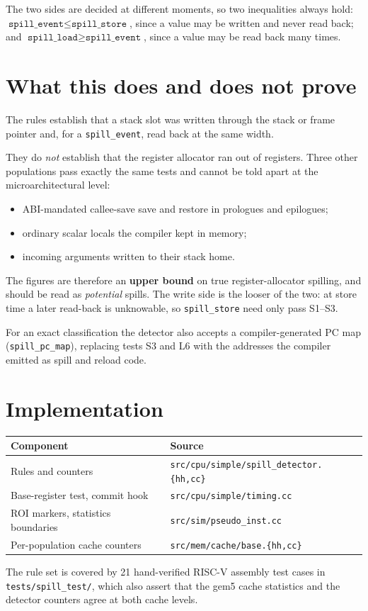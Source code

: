 \documentclass[10pt,a4paper]{article}
\begin{document}
The two sides are decided at different moments, so two inequalities always
hold: $\texttt{spill\_event} \le \texttt{spill\_store}$, since a value may be
written and never read back; and
$\texttt{spill\_load} \ge \texttt{spill\_event}$, since a value may be read
back many times.

\section{What this does and does not prove}

The rules establish that a stack slot was written through the stack or frame
pointer and, for a \texttt{spill\_event}, read back at the same width.

They do \emph{not} establish that the register allocator ran out of registers.
Three other populations pass exactly the same tests and cannot be told apart
at the microarchitectural level:

\begin{itemize}
\setlength{\itemsep}{1pt}\setlength{\topsep}{2pt}
\item ABI-mandated callee-save save and restore in prologues and epilogues;
\item ordinary scalar locals the compiler kept in memory;
\item incoming arguments written to their stack home.
\end{itemize}

The figures are therefore an \textbf{upper bound} on true register-allocator
spilling, and should be read as \emph{potential} spills. The write side is the
looser of the two: at store time a later read-back is unknowable, so
\texttt{spill\_store} need only pass S1--S3.

For an exact classification the detector also accepts a compiler-generated PC
map (\texttt{spill\_pc\_map}), replacing tests S3 and L6 with the addresses
the compiler emitted as spill and reload code.

\section{Implementation}

\begin{tabularx}{\textwidth}{@{}X l@{}}
\toprule
\textbf{Component} & \textbf{Source} \\
\midrule
Rules and counters
  & \texttt{src/cpu/simple/spill\_detector.\{hh,cc\}} \\
Base-register test, commit hook
  & \texttt{src/cpu/simple/timing.cc} \\
ROI markers, statistics boundaries
  & \texttt{src/sim/pseudo\_inst.cc} \\
Per-population cache counters
  & \texttt{src/mem/cache/base.\{hh,cc\}} \\
\bottomrule
\end{tabularx}

The rule set is covered by 21 hand-verified RISC-V assembly test cases in
\texttt{tests/spill\_test/}, which also assert that the gem5 cache statistics
and the detector counters agree at both cache levels.
\end{document}
